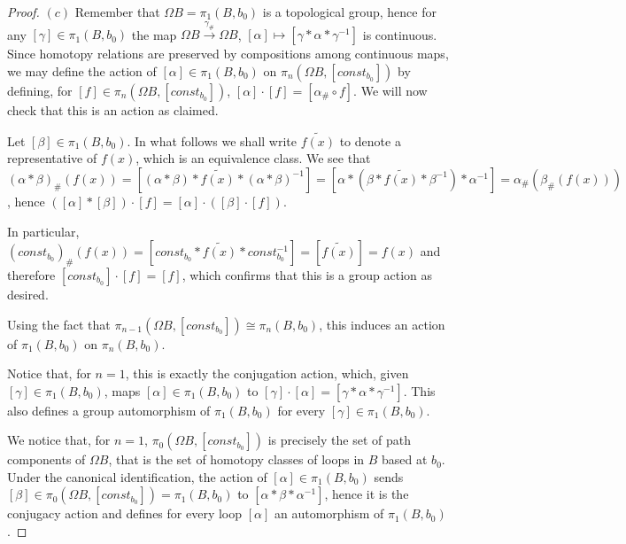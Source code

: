 \documentclass{article}
\begin{document}
\begin{proof}
    $(c)$ Remember that $\Omega B=\pi_1(B,b_0)$ is a topological group, hence
    for any $[\gamma]\in\pi_1(B,b_0)$ the map $\Omega
    B\xrightarrow{\gamma_\#}\Omega B$, $[\alpha]\mapsto 
    [\gamma*\alpha*\gamma^{-1}]$ is continuous. Since homotopy relations are
    preserved by compositions among continuous
    maps, we may define the action of $[\alpha]\in\pi_1(B,b_0)$ on $\pi_n(\Omega
    B,[const_{b_0}])$ by defining, for $[f]\in\pi_n(\Omega B,[const_{b_0}])$,
    $[\alpha]\cdot [f]=[\alpha_\#\circ f]$. We will now check that this is an
    action as claimed.

    Let $[\beta]\in\pi_1(B,b_0)$. In what follows we shall write $\tilde{f(x)}$
    to denote a representative of $f(x)$, which is an equivalence class. We see
    that
    $(\alpha*\beta)_\#(f(x))=[(\alpha*\beta)*\tilde{f(x)}*(\alpha*\beta)^{-1}]=
[\alpha*(\beta*\tilde{f(x)}*\beta^{-1})*\alpha^{-1}]=\alpha_\#(\beta_\#(f(x)))$, hence
    $([\alpha]*[\beta])\cdot [f]=[\alpha]\cdot ([\beta]\cdot [f])$.

    In particular,
    $(const_{b_0})_\#(f(x))=[const_{b_0}*\tilde{f(x)}*const_{b_0}^{-1}]=[\tilde{f(x)}]=f(x)$
    and therefore $[const_{b_0}]\cdot [f]=[f]$,
    which confirms that this is a group action as desired.
    
    Using the fact that $\pi_{n-1}(\Omega B,[const_{b_0}])\cong\pi_n(B,b_0)$,
    this induces an action of $\pi_1(B,b_0)$ on $\pi_n(B,b_0)$.

    Notice that, for $n=1$, this is exactly the conjugation action, which, given
    $[\gamma]\in\pi_1(B,b_0)$, maps $[\alpha]\in\pi_1(B,b_0)$ to $[\gamma]\cdot
    [\alpha]=[\gamma*\alpha*\gamma^{-1}]$. This also defines a group
    automorphism of $\pi_1(B,b_0)$ for every $[\gamma]\in\pi_1(B,b_0)$.

    We notice that, for $n=1$, $\pi_0(\Omega B,[const_{b_0}])$ is precisely the
    set of path components of $\Omega B$, that is the set of homotopy classes of
    loops in $B$ based at $b_0$. Under the canonical identification, the action
    of $[\alpha]\in\pi_1(B,b_0)$ sends $[\beta]\in\pi_0(\Omega
    B,[const_{b_0}])=\pi_1(B,b_0)$ to $[\alpha*\beta*\alpha^{-1}]$, hence it is
    the conjugacy action and defines for every loop $[\alpha]$ an automorphism
    of $\pi_1(B,b_0)$.
\end{proof}

\printbibliography
\end{document}
